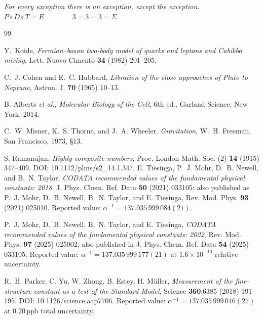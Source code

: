 \documentclass[11pt,a4paper]{article}
\theoremstyle{definition}
\theoremstyle{remark}
\begin{document}
\begin{center}
\emph{For every exception there is an exception, except the exception.}\\[4pt]
$P \circ D \circ T = E \qquad\qquad 3 = 3 = 3 = \Sigma$
\end{center}

\begin{thebibliography}{99}

Y.~Koide,
\emph{Fermion--boson two-body model of quarks and leptons and Cabibbo mixing},
Lett. Nuovo Cimento {\bf 34} (1982) 201--205.

C.~J. Cohen and E.~C. Hubbard,
\emph{Libration of the close approaches of Pluto to Neptune},
Astron. J. {\bf 70} (1965) 10--13.

B. Alberts \emph{et al.},
\emph{Molecular Biology of the Cell}, 6th ed., Garland Science, New York, 2014.

C.~W. Misner, K.~S. Thorne, and J.~A. Wheeler,
\emph{Gravitation}, W.~H. Freeman, San Francisco, 1973, \S 13.


S. Ramanujan,
\emph{Highly composite numbers},
Proc. London Math. Soc. (2) {\bf 14} (1915) 347--409.
DOI: 10.1112/plms/s2\_14.1.347.
E. Tiesinga, P.~J. Mohr, D.~B. Newell, and B.~N. Taylor,
\emph{CODATA recommended values of the fundamental physical constants: 2018},
J. Phys. Chem. Ref. Data {\bf 50} (2021) 033105;
also published as P.~J. Mohr, D.~B. Newell, B.~N. Taylor, and E. Tiesinga,
Rev. Mod. Phys. {\bf 93} (2021) 025010.
Reported value: $\alpha^{-1} = 137.035\,999\,084(21)$.

P.~J. Mohr, D.~B. Newell, B.~N. Taylor, and E. Tiesinga,
\emph{CODATA recommended values of the fundamental physical constants: 2022},
Rev. Mod. Phys. {\bf 97} (2025) 025002;
also published in J. Phys. Chem. Ref. Data {\bf 54} (2025) 033105.
Reported value: $\alpha^{-1} = 137.035\,999\,177(21)$ at $1.6\times 10^{-10}$ relative uncertainty.


R.~H. Parker, C. Yu, W. Zhong, B. Estey, H. M\"uller,
\emph{Measurement of the fine-structure constant as a test of the Standard Model},
Science {\bf 360}:6385 (2018) 191--195.
DOI: 10.1126/science.aap7706.
Reported value: $\alpha^{-1} = 137.035\,999\,046(27)$ at $0.20$\,ppb total uncertainty.


\end{thebibliography}
\end{document}
